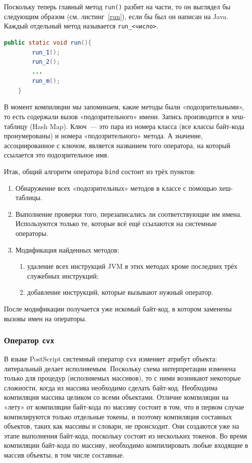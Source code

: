 	Поскольку теперь главный метод \texttt{run()} разбит на части, то он выглядел бы следующим образом (см. листинг~\ref{run}), если  бы был он написан на Java. Каждый отдельный метод называется \texttt{run\_<число>}.
	\begin{lstlisting}[label=run,caption=Структура метода run(),captionpos=b, frame = single, language = Java]
	public static void run(){
		run_1();	
		run_2();
		...
		run_m();		
	}
	\end{lstlisting}
	
	В момент компиляции мы запоминаем, какие методы были «подозрительными», то есть содержали вызов «подозрительного»  имени. Запись производится в хеш-таблицу (Hash Map). Ключ~--- это пара из номера класса (все классы байт-кода пронумерованы) и номера «подозрительного» метода. А значение, ассоциированное с ключом, является названием того оператора, на который ссылается это подозрительное имя.
	
	Итак, общий алгоритм оператора \texttt{bind} состоит из трёх пунктов:
	\begin{enumerate}
		\item Обнаружение всех «подозрительных» методов в классе с помощью хеш-таблицы.
		\item Выполнение проверки того, перезаписались ли соответствующие им имена. Используются только те, которые всё ещё ссылаются на системные операторы.
		\item Модификация найденных методов:
				\begin{enumerate}
					\item удаление всех инструкций JVM в этих методах кроме последних трёх служебных инструкций;
					\item добавление инструкций, которые вызывают нужный оператор.
				\end{enumerate}				
	\end{enumerate}
	
	После модификации получается уже искомый байт-код, в котором  заменены вызовы имен на операторы.


	\subsubsection*{Оператор  \texttt{cvx}}		
	В языке PostScript системный оператор \texttt{cvx} изменяет атрибут объекта: литеральный делает исполняемым. Поскольку схема интерпретации изменена только для процедур (исполняемых массивов), то с ними возникают некоторые сложности, когда из массива необходимо сделать байт-код. Необходима компиляция массива целиком со всеми объектами. Отличие компиляции на «лету» от компиляции байт-кода по массиву состоит в том, что в первом случае компилируются только отдельные токены, и поэтому компиляция составных объектов, таких как массивы и словари, не происходит.  Они создаются уже на этапе выполнения байт-кода, поскольку состоят из нескольких токенов. Во время компиляции байт-кода по массиву, необходимо компилировать любые входящие в массив объекты, в том числе составные.
	
